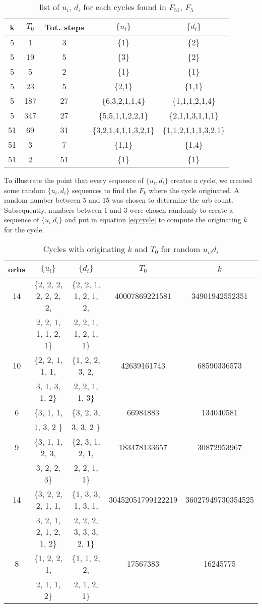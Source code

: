 \documentclass[12pt]{article} %
\begin{document}
\begin{table}[H]
    \centering
    \begin{tabular}{c|c|c|c|c}
k & $T_0$ & Tot. steps & $\{u_i\}$ & $\{d_i\}$ \\
\hline
5 & 1 & 3 & \{1\} & \{2\} \\
5 & 19 & 5 &\{3\} & \{2\} \\
5 & 5 & 2 & \{1\} &\{1\} \\
5 & 23 & 5 & \{2,1\} &\{1,1\} \\
5 & 187 & 27 & \{6,3,2,1,1,4\} & \{1,1,1,2,1,4\} \\
5 & 347 & 27 & \{5,5,1,1,2,2,1\} & \{2,1,1,3,1,1,1\} \\
51 & 69 & 31 &\{3,2,1,4,1,1,3,2,1\} &\{1,1,2,1,1,1,3,2,1\} \\
51 & 3 & 7 &\{1,1\} &\{1,4\} \\
51 & 2 & 51 &\{1\} &\{1\} \\
\end{tabular}
\caption{list of $u_i$, $d_i$ for each cycles found in $F_{51}$, $F_5$}
\label{tab:steps}
\end{table}

To illustrate the point that every sequence of $\{u_i,d_i\}$ creates a cycle, we created some random $\{u_i, d_i\}$ sequences to find the $F_k$ where the cycle originated. A random number between $5$ and $15$ was chosen to determine the orb count. Subsequently, numbers between 1 and 3 were chosen randomly to create a sequence of $\{u_i$,$d_i\}$ and put in equation \ref{eq:cycle} to compute the originating $k$ for the cycle.

\begin{table}[H]
\small
    \centering
    \begin{tabular}{|c|c|c|c|c|}
\hline
orbs & $\{u_i\}$ & $\{d_i\}$ & $T_0$ & $k$ \\
\hline
14 & \{2, 2, 2, 2, 2, 2, 2, & \{2, 2, 1, 1, 2, 1, 2,  & 40007869221581 & 34901942552351\\
& 2, 2, 1, 1, 1, 2, 1\} & 2, 2, 1, 1, 2, 1, 1\} & &\\
\hline
10 & \{2, 2, 1, 1, 1, & \{1, 2, 2, 3, 2, & 42639161743 & 68590336573 \\
& 3, 1, 3, 1, 2\}&  2, 2, 1, 1, 3\} & &\\
\hline
6 & \{3, 1, 1, & \{3, 2, 3,  & 66984883 & 134040581 \\
& 1, 3, 2 \} & 3, 3, 2 \} & & \\
\hline
9 & \{3, 1, 1, 2, 3, & \{2, 3, 1, 2, 1, & 183478133657 & 30872953967 \\
&  3, 2, 2, 3\} &  2, 2, 1, 1\} & &\\
\hline
14 & \{3, 2, 2, 2, 1, 1, & \{1, 3, 3, 1, 3, 1, & 30452051799122219 & 36027949730354525\\
& 3, 2, 1, 2, 1, 2, 1, 2\} &  2, 2, 2, 3, 3, 3, 2, 1\} & & \\
\hline
8 & \{1, 2, 2, 1,  & \{1, 1, 2, 2,  & 17567383 & 16245775\\
& 2, 1, 1, 2\} & 2, 1, 2, 1\} & & \\
\hline
\end{tabular}
\caption{Cycles with originating $k$ and $T_0$ for random $u_i$,$d_i$}
\label{tab:random}
\end{table}
\end{document}
